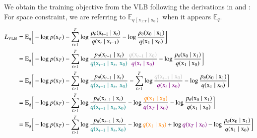     We obtain the training objective from the VLB following the derivations in \cite{sohldickstein2015deep} and \cite{ho2020denoising}: 
    For space constraint, we are referring to $\mathbb{E}_{q(\mathrm{x}_{1:T}\mid\mathrm{x}_{0})}$ when it appears $\mathbb{E}_{q}$.
    \begin{equation}\label{eqn:ELBO2}
    \begin{split}
     L_{\text{\scriptsize{\text{VLB}}}} & = \mathbb{E}_{q}\bigg[-\log p(\mathrm{x}_{T}) - \sum_{t>1}^{T} \log \frac{p_{\theta}(\mathrm{x}_{t-1}\mid\mathrm{x}_{t})}{q(\mathrm{x}_{t}\mid\mathrm{x}_{t-1})}-\log\frac{p_{\theta}(\mathrm{x}_{0}\mid\mathrm{x}_{1})}{q(\mathrm{x}_{1}\mid\mathrm{x}_{0})}\bigg] \\
    & = \mathbb{E}_{q}\bigg[-\log p(\mathrm{x}_{T}) - \sum_{t>1}^{T} \log \frac{p_{\theta}(\mathrm{x}_{t-1}\mid\mathrm{x}_{t})}{\textcolor{teal}{q(\mathrm{x}_{t-1}\mid\mathrm{x}_{t},~\mathrm{x}_{0})}}\frac{\textcolor{lightgray}{q(\mathrm{x}_{t-1}\mid\mathrm{x}_{0})}}{\textcolor{violet}{q(\mathrm{x}_{t}\mid\mathrm{x}_{0})}}-\log\frac{p_{\theta}(\mathrm{x}_{0}\mid\mathrm{x}_{1})}{q(\mathrm{x}_{1}\mid\mathrm{x}_{0})}\bigg] \\
    & = \mathbb{E}_{q}\bigg[-\log p(\mathrm{x}_{T}) - \sum_{t>1}^{T} \log \frac{p_{\theta}(\mathrm{x}_{t-1}\mid\mathrm{x}_{t})}{\textcolor{teal}{q(\mathrm{x}_{t-1}\mid\mathrm{x}_{t},~\mathrm{x}_{0})}} -\sum_{t>1}^{T}\log \frac{\textcolor{lightgray}{q(\mathrm{x}_{t-1}\mid\mathrm{x}_{0})}}{\textcolor{violet}{q(\mathrm{x}_{t}\mid\mathrm{x}_{0})}}-\log\frac{p_{\theta}(\mathrm{x}_{0}\mid\mathrm{x}_{1})}{q(\mathrm{x}_{1}\mid\mathrm{x}_{0})}\bigg] \\
    & = \mathbb{E}_{q}\bigg[-\log p(\mathrm{x}_{T}) - \sum_{t>1}^{T} \log \frac{p_{\theta}(\mathrm{x}_{t-1}\mid\mathrm{x}_{t})}{\textcolor{teal}{q(\mathrm{x}_{t-1}\mid\mathrm{x}_{t}, \mathrm{x}_{0})}}- \log\frac{\textcolor{orange}{q(\mathrm{x}_{1}\mid\mathrm{x}_{0})}}{\textcolor{violet}{q(\mathrm{x}_{T}\mid\mathrm{x}_{0})}} -\log\frac{p_{\theta}(\mathrm{x}_{0}\mid\mathrm{x}_{1})}{q(\mathrm{x}_{1}\mid\mathrm{x}_{0})}\bigg] \\
    & = \mathbb{E}_{q}\bigg[-\log p(\mathrm{x}_{T}) - \sum_{t>1}^{T} \log \frac{p_{\theta}(\mathrm{x}_{t-1}\mid\mathrm{x}_{t})}{\textcolor{teal}{q(\mathrm{x}_{t-1}\mid\mathrm{x}_{t}, \mathrm{x}_{0})}}- \log\textcolor{orange}{q(\mathrm{x}_{1}\mid\mathrm{x}_{0})} + \log \textcolor{violet}{q(\mathrm{x}_{T}\mid\mathrm{x}_{0})} -\log\frac{p_{\theta}(\mathrm{x}_{0}\mid\mathrm{x}_{1})}{q(\mathrm{x}_{1}\mid\mathrm{x}_{0})}\bigg] \\

\end{split}
\end{equation}
